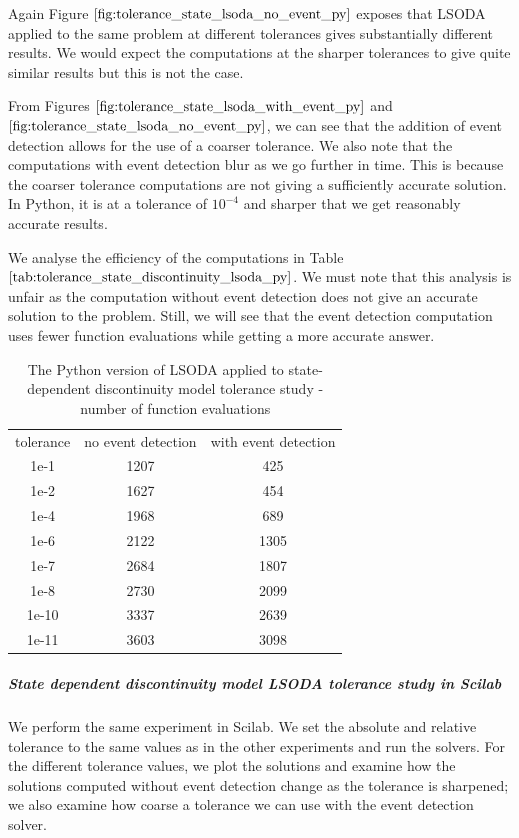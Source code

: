Again Figure $\ref{fig:tolerance_state_lsoda_no_event_py}$ exposes that LSODA applied to the same problem at different tolerances gives substantially different results. We would expect the computations at the sharper tolerances to give quite similar results but this is not the case.

From Figures $\ref{fig:tolerance_state_lsoda_with_event_py}$ and $\ref{fig:tolerance_state_lsoda_no_event_py}$, we can see that the addition of event detection allows for the use of a coarser tolerance. We also note that the computations with event detection blur as we go further in time. This is because the coarser tolerance computations are not giving a sufficiently accurate solution. In Python, it is at a tolerance of $10^{-4}$ and sharper that we get reasonably accurate results. 

We analyse the efficiency of the computations in Table $\ref{tab:tolerance_state_discontinuity_lsoda_py}$. We must note that this analysis is unfair as the computation without event detection does not give an accurate solution to the problem. Still, we will see that the event detection computation uses fewer function evaluations while getting a more accurate answer.

\begin{table}[h]
\caption {The Python version of LSODA applied to state-dependent discontinuity model tolerance study - number of function evaluations} \label{tab:tolerance_state_discontinuity_lsoda_py} 
\begin{center}
\begin{tabular}{ c c c }
tolerance & no event detection & with event detection \\
1e-1 & 1207 & 425 \\
1e-2 & 1627 & 454 \\
1e-4 & 1968 & 689 \\
1e-6 & 2122 & 1305 \\
1e-7 & 2684 & 1807 \\
1e-8 & 2730 & 2099 \\
1e-10 & 3337 & 2639 \\
1e-11 & 3603 & 3098 \\
\end{tabular}
\end{center}
\end{table}

\subparagraph{State dependent discontinuity model LSODA tolerance study in Scilab}

We perform the same experiment in Scilab. We set the absolute and relative tolerance to the same values as in the other experiments and run the solvers. For the different tolerance values, we plot the solutions and examine how the solutions computed without event detection change as the tolerance is sharpened; we also examine how coarse a tolerance we can use with the event detection solver.

